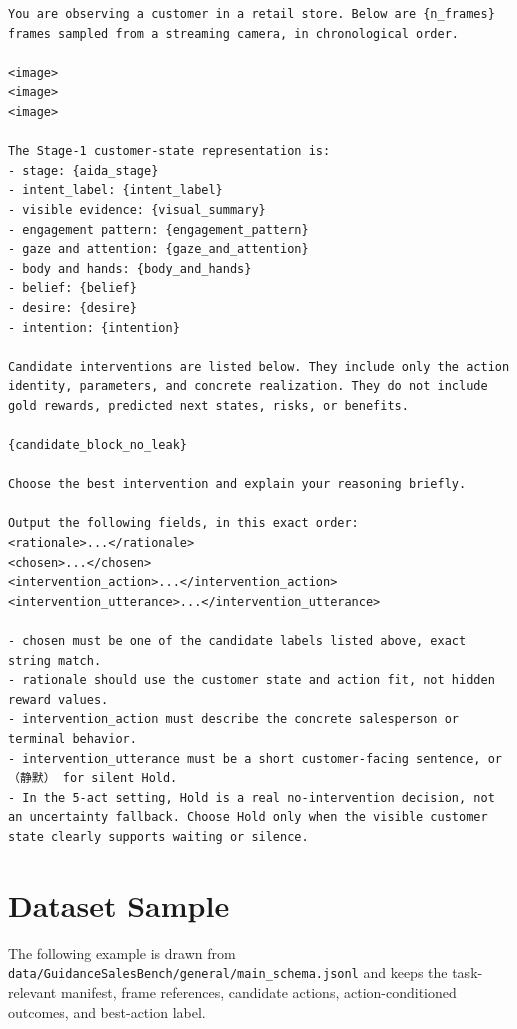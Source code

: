\begin{verbatim}
You are observing a customer in a retail store. Below are {n_frames} frames sampled from a streaming camera, in chronological order.

<image>
<image>
<image>

The Stage-1 customer-state representation is:
- stage: {aida_stage}
- intent_label: {intent_label}
- visible evidence: {visual_summary}
- engagement pattern: {engagement_pattern}
- gaze and attention: {gaze_and_attention}
- body and hands: {body_and_hands}
- belief: {belief}
- desire: {desire}
- intention: {intention}

Candidate interventions are listed below. They include only the action identity, parameters, and concrete realization. They do not include gold rewards, predicted next states, risks, or benefits.

{candidate_block_no_leak}

Choose the best intervention and explain your reasoning briefly.

Output the following fields, in this exact order:
<rationale>...</rationale>
<chosen>...</chosen>
<intervention_action>...</intervention_action>
<intervention_utterance>...</intervention_utterance>

- chosen must be one of the candidate labels listed above, exact string match.
- rationale should use the customer state and action fit, not hidden reward values.
- intervention_action must describe the concrete salesperson or terminal behavior.
- intervention_utterance must be a short customer-facing sentence, or （静默） for silent Hold.
- In the 5-act setting, Hold is a real no-intervention decision, not an uncertainty fallback. Choose Hold only when the visible customer state clearly supports waiting or silence.
\end{verbatim}

\section{Dataset Sample}
\label{app:sample}

The following example is drawn from \texttt{data/GuidanceSalesBench/general/main\_schema.jsonl} and keeps the task-relevant manifest, frame references, candidate actions, action-conditioned outcomes, and best-action label.

